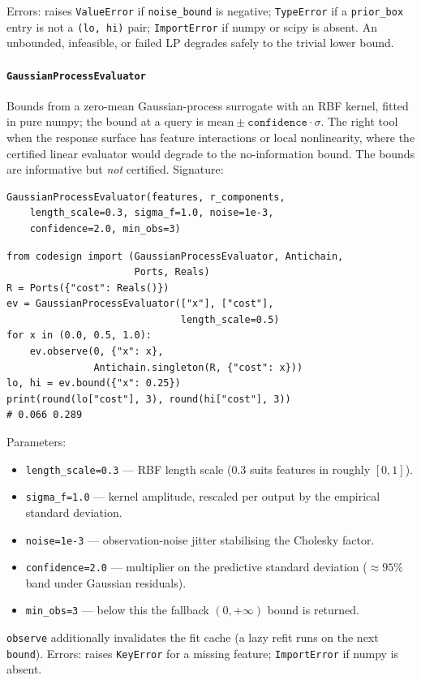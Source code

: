 \documentclass[11pt,a4paper]{article}
\begin{document}
Errors: raises \texttt{ValueError} if \texttt{noise\_bound} is negative;
\texttt{TypeError} if a \texttt{prior\_box} entry is not a \texttt{(lo, hi)}
pair; \texttt{ImportError} if numpy or scipy is absent. An unbounded,
infeasible, or failed LP degrades safely to the trivial lower bound.

\paragraph{\texttt{GaussianProcessEvaluator}}%
\label{ref:online:gaussianprocessevaluator}
Bounds from a zero-mean Gaussian-process surrogate with an RBF kernel,
fitted in pure numpy; the bound at a query is $\text{mean} \pm
\texttt{confidence}\cdot\sigma$. The right tool when the response surface has
feature interactions or local nonlinearity, where the certified linear
evaluator would degrade to the no-information bound. The bounds are
informative but \emph{not} certified. Signature:
\begin{lstlisting}
GaussianProcessEvaluator(features, r_components,
    length_scale=0.3, sigma_f=1.0, noise=1e-3,
    confidence=2.0, min_obs=3)
\end{lstlisting}
\begin{lstlisting}
from codesign import (GaussianProcessEvaluator, Antichain,
                      Ports, Reals)
R = Ports({"cost": Reals()})
ev = GaussianProcessEvaluator(["x"], ["cost"],
                              length_scale=0.5)
for x in (0.0, 0.5, 1.0):
    ev.observe(0, {"x": x},
               Antichain.singleton(R, {"cost": x}))
lo, hi = ev.bound({"x": 0.25})
print(round(lo["cost"], 3), round(hi["cost"], 3))
# 0.066 0.289
\end{lstlisting}
Parameters:
\begin{itemize}[nosep]
  \item \texttt{length\_scale=0.3} --- RBF length scale (0.3 suits features
    in roughly $[0,1]$).
  \item \texttt{sigma\_f=1.0} --- kernel amplitude, rescaled per output by
    the empirical standard deviation.
  \item \texttt{noise=1e-3} --- observation-noise jitter stabilising the
    Cholesky factor.
  \item \texttt{confidence=2.0} --- multiplier on the predictive standard
    deviation ($\approx 95\%$ band under Gaussian residuals).
  \item \texttt{min\_obs=3} --- below this the fallback $(0,+\infty)$ bound
    is returned.
\end{itemize}
\texttt{observe} additionally invalidates the fit cache (a lazy refit runs
on the next \texttt{bound}). Errors: raises \texttt{KeyError} for a missing
feature; \texttt{ImportError} if numpy is absent.
\end{document}
